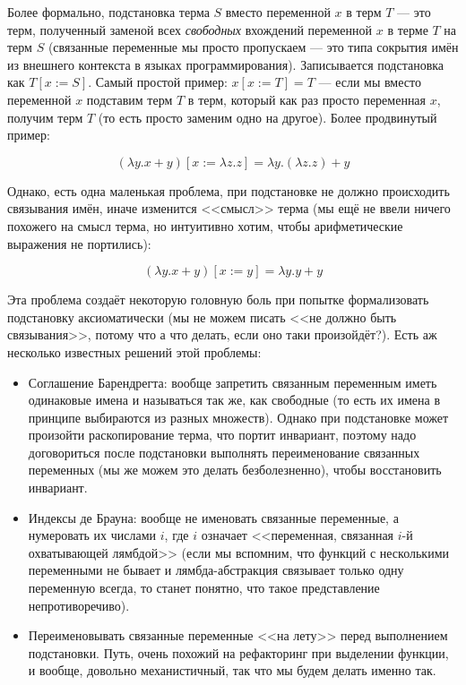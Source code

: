 \documentclass[a5paper]{article}
\begin{document}
Более формально, подстановка терма $S$ вместо переменной $x$ в терм $T$ --- это терм, полученный заменой всех \textit{свободных} вхождений переменной $x$ в терме $T$ на терм $S$ (связанные переменные мы просто пропускаем --- это типа сокрытия имён из внешнего контекста в языках программирования). Записывается подстановка как $T[x := S]$. Самый простой пример:  $x[x := T] = T$ --- если мы вместо переменной $x$ подставим терм $T$ в терм, который как раз просто переменная $x$, получим терм $T$ (то есть просто заменим одно на другое). Более продвинутый пример:

$$(\lambda y.x + y)[x := \lambda z.z] = \lambda y. (\lambda z.z) + y$$

Однако, есть одна маленькая проблема, при подстановке не должно происходить связывания имён, иначе изменится <<смысл>> терма (мы ещё не ввели ничего похожего на смысл терма, но интуитивно хотим, чтобы арифметические выражения не портились):

$$(\lambda y.x + y)[x := y] = \lambda y. y + y$$

Эта проблема создаёт некоторую головную боль при попытке формализовать подстановку аксиоматически (мы не можем писать <<не должно быть связывания>>, потому что а что делать, если оно таки произойдёт?). Есть аж несколько известных решений этой проблемы:

\begin{itemize}
    \item Соглашение Барендрегта: вообще запретить связанным переменным иметь одинаковые имена и называться так же, как свободные (то есть их имена в принципе выбираются из разных множеств). Однако при подстановке может произойти раскопирование терма, что портит инвариант, поэтому надо договориться после подстановки выполнять переименование связанных переменных (мы же можем это делать безболезненно), чтобы восстановить инвариант.
    \item Индексы де Брауна: вообще не именовать связанные переменные, а нумеровать их числами $i$, где $i$ означает <<переменная, связанная $i$-й охватывающей лямбдой>>  (если мы вспомним, что функций с несколькими переменными не бывает и лямбда-абстракция связывает только одну переменную всегда, то станет понятно, что такое представление непротиворечиво).
    \item Переименовывать связанные переменные <<на лету>> перед выполнением подстановки. Путь, очень похожий на рефакторинг при выделении функции, и вообще, довольно механистичный, так что мы будем делать именно так.
\end{itemize}
\end{document}
